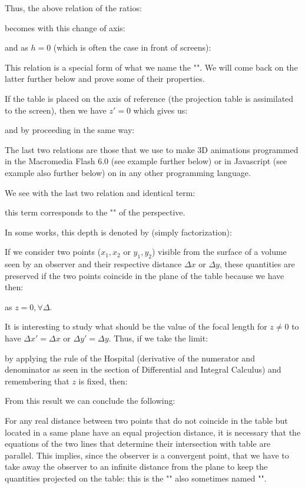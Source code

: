 	Thus, the above relation of the ratios:
	
	becomes with this change of axis:
	
	and as $h = 0$ (which is often the case in front of screens):
	
	\begin{tcolorbox}[title=Remark,colframe=black,arc=10pt]
	This relation is a special form of what we name the "". We will come back on the latter further below and prove some of their properties.
	\end{tcolorbox}
	If the table is placed on the axis of reference (the projection table is assimilated to the screen), then we have $z '= 0$ which gives us:
	
	and by proceeding in the same way:
	
	\begin{tcolorbox}[title=Remark,colframe=black,arc=10pt]
	The last two relations are those that we use to make 3D animations programmed in the Macromedia Flash 6.0 (see example further below) or in Javascript (see example also further below) on in any other programming language.
	\end{tcolorbox}
	
	
	We see with the last two relation and identical term:
	
	this term corresponds to the "" of the perspective.

	In some works, this depth is denoted by (simply factorization):
	
	If we consider two points ($x_1,x_2$ or $y_1,y_2$) visible from the surface of a volume seen by an observer and their respective distance $\Delta x$ or $\Delta y$, these quantities are preserved if the two points coincide in the plane of the table because we have then:
	
	as $z=0,\forall \Delta$.

	It is interesting to study what should be the value of the focal length for $z\neq 0$ to have $\Delta x'=\Delta x$ or $\Delta y'=\Delta y$. Thus, if we take the limit:
	
	by applying the rule of the Hospital (derivative of the numerator and denominator as seen in the section of Differential and Integral Calculus) and remembering that $z$ is fixed, then:
	
	From this result we can conclude the following:
	
	For any real distance between two points that do not coincide in the table but located in a same plane have an equal projection distance, it is necessary that the equations of the two lines that determine their intersection with table are parallel. This implies, since the observer is a convergent point, that we have to take away the observer to an infinite distance from the plane to keep the quantities projected on the table: this is the "" also sometimes named "".
	
